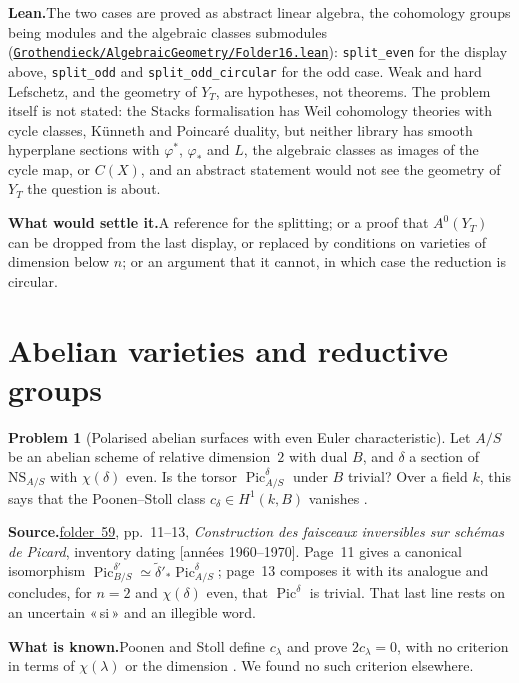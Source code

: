 \documentclass[11pt]{article}
\newcommand{\q}[1]{«\,#1\,»}
\newcommand{\fac}[1]{\href{https://grothendieck.umontpellier.fr/#1.pdf}{folder~#1}}
\newcommand{\Pic}{\operatorname{Pic}}
\theoremstyle{definition}
\newtheorem{problem}{Problem}
\theoremstyle{plain}\newtheorem*{proposition}{Proposition}\theoremstyle{definition}
\newcommand{\entry}[1]{\par\medskip\noindent\textbf{#1}\enspace}
\newcommand{\src}[1]{\entry{Source.}#1}
\newcommand{\known}{\entry{What is known.}}
\newcommand{\leanst}{\entry{Lean.}}
\newcommand{\settle}{\entry{What would settle it.}}
\begin{document}
\leanst The two cases are proved as abstract linear algebra, the cohomology groups being modules and the algebraic classes submodules (\href{https://github.com/Commutator-IO/GrothendieckArchivesProofs/blob/main/Grothendieck/AlgebraicGeometry/Folder16.lean}{\nolinkurl{Grothendieck/AlgebraicGeometry/Folder16.lean}}): \texttt{split\_even} for the display above, \texttt{split\_odd} and \texttt{split\_odd\_circular} for the odd case. Weak and hard Lefschetz, and the geometry of $Y_T$, are hypotheses, not theorems. The problem itself is not stated: the Stacks formalisation \cite{axiomstacks} has Weil cohomology theories with cycle classes, Künneth and Poincaré duality, but neither library has smooth hyperplane sections with $\varphi^*$, $\varphi_*$ and $L$, the algebraic classes as images of the cycle map, or $C(X)$, and an abstract statement would not see the geometry of $Y_T$ the question is about.

\settle A reference for the splitting; or a proof that $A^0(Y_T)$ can be dropped from the last display, or replaced by conditions on varieties of dimension below $n$; or an argument that it cannot, in which case the reduction is circular.

\section{Abelian varieties and reductive groups}

\begin{problem}[Polarised abelian surfaces with even Euler characteristic]\label{p:surf}
Let $A/S$ be an abelian scheme of relative dimension~$2$ with dual $B$, and $\delta$ a section of $\mathrm{NS}_{A/S}$ with $\chi(\delta)$ even. Is the torsor $\Pic^\delta_{A/S}$ under $B$ trivial? Over a field $k$, this says that the Poonen--Stoll class $c_\delta \in H^1(k, B)$ vanishes \cite{poonenstoll}.
\end{problem}

\src{\fac{59}, pp.~11--13, \emph{Construction des faisceaux inversibles sur schémas de Picard}, inventory dating [années 1960--1970]. Page~11 gives a canonical isomorphism $\Pic^{\delta'}_{B/S} \simeq \tilde\delta'_*\Pic^\delta_{A/S}$; page~13 composes it with its analogue and concludes, for $n = 2$ and $\chi(\delta)$ even, that $\Pic^\delta$ is trivial. That last line rests on an uncertain \q{si} and an illegible word.}

\known Poonen and Stoll define $c_\lambda$ and prove $2c_\lambda = 0$, with no criterion in terms of $\chi(\lambda)$ or the dimension \cite[\S4]{poonenstoll}. We found no such criterion elsewhere.
\end{document}
